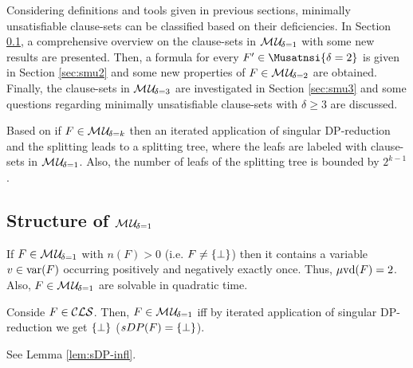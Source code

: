 \documentclass{report}
\begin{document}
Considering definitions and tools given in previous sections, minimally unsatisfiable clause-sets can be classified based on their deficiencies. In Section \ref{sec:smu1}, a comprehensive overview on the clause-sets in $\mathcal{M\hspace{0.8pt}U}_{\!\delta=1}$ with some new results are presented. Then, a formula for every $F' \in \Musatnsi{\delta=2}$ is given in Section \ref{sec:smu2} and some new properties of $F \in \mathcal{M\hspace{0.8pt}U}_{\!\delta=2}$ are obtained. Finally, the clause-sets in $ \mathcal{M\hspace{0.8pt}U}_{\!\delta=3}$ are investigated in Section \ref{sec:smu3} and some questions regarding minimally unsatisfiable clause-sets with $\delta \ge 3$ are discussed. 

\begin{lem}\label{lem:mu-refu-tree}
Based on \cite{KleineBuening2000SubclassesMU} if $F \in \mathcal{M\hspace{0.8pt}U}_{\!\delta=k}$ then an iterated application of singular DP-reduction and the splitting leads to a splitting tree, where the leafs are labeled with clause-sets in $\mathcal{M\hspace{0.8pt}U}_{\!\delta=1}$. Also, the number of leafs of the splitting tree is bounded by $2^{k-1}$.
\end{lem}
\subsection{Structure of $\mathcal{M\hspace{0.8pt}U}_{\!\delta=1}$}
\label{sec:smu1}

\begin{lem}\label{lem:mu1-uvd}
\cite{KleineBuening2000SubclassesMU} If $F \in \mathcal{M\hspace{0.8pt}U}_{\!\delta=1}$ with $n(F) > 0$ (i.e. $F \not = \{ \bot \}$) then it contains a variable $v \in \operatorname{var}(F)$ occurring positively and negatively exactly once. Thus, $\operatorname{\mu\!\operatorname{vd}}(F) = 2$. Also, $F \in \mathcal{M\hspace{0.8pt}U}_{\!\delta=1}$ are solvable in quadratic time.
\end{lem}

\begin{lem}\label{lem:mu1-sdp}Conside $F \in \mathcal{CLS}$. Then, $F \in \mathcal{M\hspace{0.8pt}U}_{\!\delta=1}$ iff by iterated application of singular DP-reduction we get $\{ \bot \}$ ($sDP(F) =\{ \bot \}$). 
\end{lem}
\begin{prf}
See Lemma \ref{lem:sDP-infl}.
\end{prf}
\end{document}
